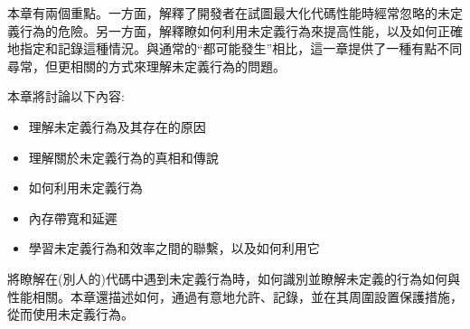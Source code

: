本章有兩個重點。一方面，解釋了開發者在試圖最大化代碼性能時經常忽略的未定義行為的危險。另一方面，解釋瞭如何利用未定義行為來提高性能，以及如何正確地指定和記錄這種情況。與通常的“都可能發生”相比，這一章提供了一種有點不同尋常，但更相關的方式來理解未定義行為的問題。

本章將討論以下內容:

\begin{itemize}
\item 
理解未定義行為及其存在的原因

\item 
理解關於未定義行為的真相和傳說

\item 
如何利用未定義行為

\item 
內存帶寬和延遲

\item 
學習未定義行為和效率之間的聯繫，以及如何利用它
\end{itemize}

將瞭解在(別人的)代碼中遇到未定義行為時，如何識別並瞭解未定義的行為如何與性能相關。本章還描述如何，通過有意地允許、記錄，並在其周圍設置保護措施，從而使用未定義行為。
